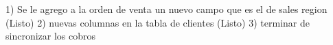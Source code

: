 1) Se le agrego a la orden  de venta un nuevo campo que es el de sales region (Listo)
2) nuevas columnas en la tabla de clientes (Listo)
3) terminar de sincronizar los cobros 







